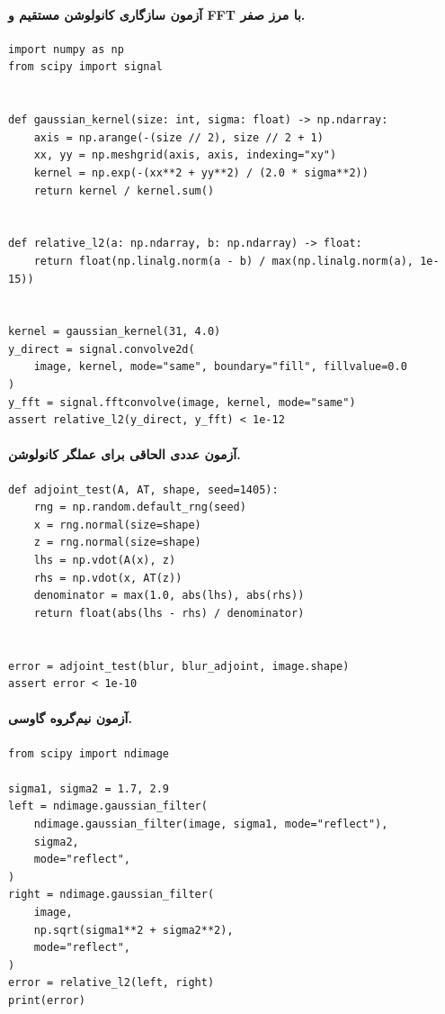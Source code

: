 \documentclass[12pt,openany,oneside]{book}
\begin{document}
\paragraph{آزمون سازگاری کانولوشن مستقیم و FFT با مرز صفر.}
\begin{LTR}
\begin{lstlisting}
import numpy as np
from scipy import signal


def gaussian_kernel(size: int, sigma: float) -> np.ndarray:
    axis = np.arange(-(size // 2), size // 2 + 1)
    xx, yy = np.meshgrid(axis, axis, indexing="xy")
    kernel = np.exp(-(xx**2 + yy**2) / (2.0 * sigma**2))
    return kernel / kernel.sum()


def relative_l2(a: np.ndarray, b: np.ndarray) -> float:
    return float(np.linalg.norm(a - b) / max(np.linalg.norm(a), 1e-15))


kernel = gaussian_kernel(31, 4.0)
y_direct = signal.convolve2d(
    image, kernel, mode="same", boundary="fill", fillvalue=0.0
)
y_fft = signal.fftconvolve(image, kernel, mode="same")
assert relative_l2(y_direct, y_fft) < 1e-12
\end{lstlisting}
\end{LTR}

\paragraph{آزمون عددی الحاقی برای عملگر کانولوشن.}
\begin{LTR}
\begin{lstlisting}
def adjoint_test(A, AT, shape, seed=1405):
    rng = np.random.default_rng(seed)
    x = rng.normal(size=shape)
    z = rng.normal(size=shape)
    lhs = np.vdot(A(x), z)
    rhs = np.vdot(x, AT(z))
    denominator = max(1.0, abs(lhs), abs(rhs))
    return float(abs(lhs - rhs) / denominator)


error = adjoint_test(blur, blur_adjoint, image.shape)
assert error < 1e-10
\end{lstlisting}
\end{LTR}

\paragraph{آزمون نیم‌گروه گاوسی.}
\begin{LTR}
\begin{lstlisting}
from scipy import ndimage

sigma1, sigma2 = 1.7, 2.9
left = ndimage.gaussian_filter(
    ndimage.gaussian_filter(image, sigma1, mode="reflect"),
    sigma2,
    mode="reflect",
)
right = ndimage.gaussian_filter(
    image,
    np.sqrt(sigma1**2 + sigma2**2),
    mode="reflect",
)
error = relative_l2(left, right)
print(error)
\end{lstlisting}
\end{LTR}
\end{document}
